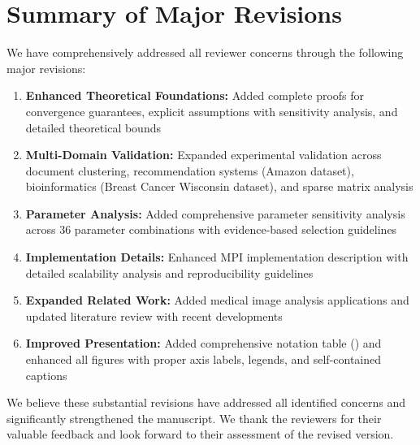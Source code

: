 \documentclass{ar2rc}
\theoremstyle{definition}
\theoremstyle{remark} %
\begin{document}



\section{Summary of Major Revisions}

We have comprehensively addressed all reviewer concerns through the following major revisions:

\begin{enumerate}
  \item \textbf{Enhanced Theoretical Foundations:} Added complete proofs for convergence guarantees, explicit assumptions with sensitivity analysis, and detailed theoretical bounds
  \item \textbf{Multi-Domain Validation:} Expanded experimental validation across document clustering, recommendation systems (Amazon dataset), bioinformatics (Breast Cancer Wisconsin dataset), and sparse matrix analysis
  \item \textbf{Parameter Analysis:} Added comprehensive parameter sensitivity analysis across 36 parameter combinations with evidence-based selection guidelines
  \item \textbf{Implementation Details:} Enhanced MPI implementation description with detailed scalability analysis and reproducibility guidelines
  \item \textbf{Expanded Related Work:} Added medical image analysis applications and updated literature review with recent developments
  \item \textbf{Improved Presentation:} Added comprehensive notation table () and enhanced all figures with proper axis labels, legends, and self-contained captions
\end{enumerate}

We believe these substantial revisions have addressed all identified concerns and significantly strengthened the manuscript. We thank the reviewers for their valuable feedback and look forward to their assessment of the revised version.

\printbibliography
\end{document}
